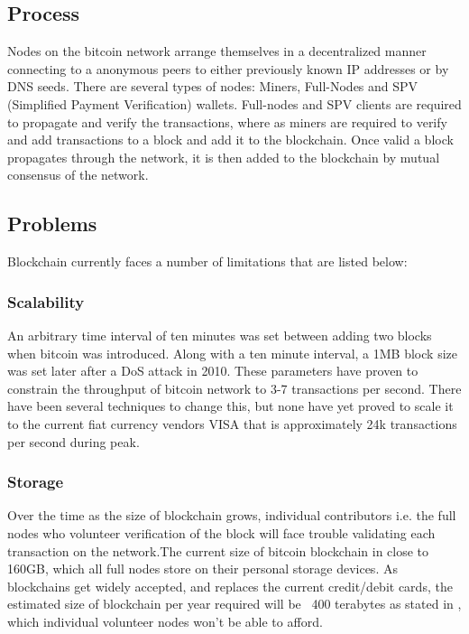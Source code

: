 \documentclass[journal,12pt,onecolumn,draftclsnofoot,]{IEEEtran}
\begin{document}
\subsection{Process}
Nodes on the bitcoin network arrange themselves in a decentralized manner
connecting to a anonymous peers to either previously known IP
addresses or by DNS seeds. There are several types of nodes: Miners, 
Full-Nodes and SPV (Simplified Payment Verification) wallets. Full-nodes and SPV
clients are required to propagate and verify the transactions, where as miners
are required to verify and add transactions to a block and add it to the
blockchain. Once valid a block propagates through the network, it is then added to the
blockchain by mutual consensus of the network.

\subsection{Problems}
Blockchain currently faces a number of limitations that are listed below:

\subsubsection{Scalability}
An arbitrary time interval of ten minutes was set between adding two blocks when
bitcoin was introduced. Along with a ten minute interval, a 1MB block size was
set later after a DoS attack in 2010. These parameters have proven to constrain
the throughput of bitcoin network to 3-7 transactions per second. There have
been several techniques to change this, but none have yet proved to scale it to
the current fiat currency vendors VISA that is approximately 24k transactions
per second during peak.

\subsubsection{Storage}
Over the time as the size of blockchain grows, individual contributors i.e. the
full nodes who volunteer verification of the block will face trouble validating
each transaction on the network.The current size of bitcoin blockchain in close
to 160GB, which all full nodes store on their personal storage devices. As
blockchains get widely accepted, and replaces the current credit/debit cards,
the estimated size of blockchain per year required will be ~400 terabytes as
stated in \cite{lightning}, which
individual volunteer nodes won't be able to afford. 
\end{document}
